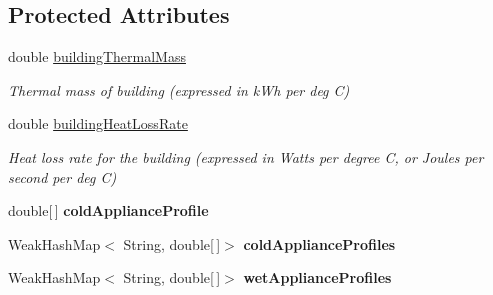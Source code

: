 \subsection*{Protected Attributes}
\begin{DoxyCompactItemize}
\item 
\hypertarget{classuk_1_1ac_1_1dmu_1_1iesd_1_1cascade_1_1agents_1_1prosumers_1_1_household_prosumer_a111416f336c008417a0bcc1e767a2db1}{double \hyperlink{classuk_1_1ac_1_1dmu_1_1iesd_1_1cascade_1_1agents_1_1prosumers_1_1_household_prosumer_a111416f336c008417a0bcc1e767a2db1}{building\-Thermal\-Mass}}\label{classuk_1_1ac_1_1dmu_1_1iesd_1_1cascade_1_1agents_1_1prosumers_1_1_household_prosumer_a111416f336c008417a0bcc1e767a2db1}

\begin{DoxyCompactList}\small\item\em Thermal mass of building (expressed in k\-Wh per deg C) \end{DoxyCompactList}\item 
\hypertarget{classuk_1_1ac_1_1dmu_1_1iesd_1_1cascade_1_1agents_1_1prosumers_1_1_household_prosumer_a98d6038003235b3f82cf20a630c7219d}{double \hyperlink{classuk_1_1ac_1_1dmu_1_1iesd_1_1cascade_1_1agents_1_1prosumers_1_1_household_prosumer_a98d6038003235b3f82cf20a630c7219d}{building\-Heat\-Loss\-Rate}}\label{classuk_1_1ac_1_1dmu_1_1iesd_1_1cascade_1_1agents_1_1prosumers_1_1_household_prosumer_a98d6038003235b3f82cf20a630c7219d}

\begin{DoxyCompactList}\small\item\em Heat loss rate for the building (expressed in Watts per degree C, or Joules per second per deg C) \end{DoxyCompactList}\item 
\hypertarget{classuk_1_1ac_1_1dmu_1_1iesd_1_1cascade_1_1agents_1_1prosumers_1_1_household_prosumer_a17eeb8d7cebc2e37a35891f28bf51e98}{double\mbox{[}$\,$\mbox{]} {\bfseries cold\-Appliance\-Profile}}\label{classuk_1_1ac_1_1dmu_1_1iesd_1_1cascade_1_1agents_1_1prosumers_1_1_household_prosumer_a17eeb8d7cebc2e37a35891f28bf51e98}

\item 
\hypertarget{classuk_1_1ac_1_1dmu_1_1iesd_1_1cascade_1_1agents_1_1prosumers_1_1_household_prosumer_ab884383f269d4bf35c331a2ce4df4489}{Weak\-Hash\-Map$<$ String, double\mbox{[}$\,$\mbox{]}$>$ {\bfseries cold\-Appliance\-Profiles}}\label{classuk_1_1ac_1_1dmu_1_1iesd_1_1cascade_1_1agents_1_1prosumers_1_1_household_prosumer_ab884383f269d4bf35c331a2ce4df4489}

\item 
\hypertarget{classuk_1_1ac_1_1dmu_1_1iesd_1_1cascade_1_1agents_1_1prosumers_1_1_household_prosumer_a373dba447f657c82f32ddae924c8c967}{Weak\-Hash\-Map$<$ String, double\mbox{[}$\,$\mbox{]}$>$ {\bfseries wet\-Appliance\-Profiles}}\label{classuk_1_1ac_1_1dmu_1_1iesd_1_1cascade_1_1agents_1_1prosumers_1_1_household_prosumer_a373dba447f657c82f32ddae924c8c967}

\end{DoxyCompactItemize}
